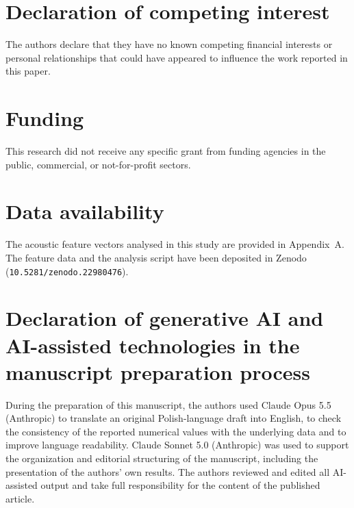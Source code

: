 
\section*{Declaration of competing interest}
The authors declare that they have no known competing financial interests or personal relationships that could have appeared to influence the work reported in this paper.

\section*{Funding}
This research did not receive any specific grant from funding agencies in the public, commercial, or not-for-profit sectors.

\section*{Data availability}
The acoustic feature vectors analysed in this study are provided in Appendix~A. The feature data and the analysis script have been deposited in  Zenodo (\texttt{10.5281/zenodo.22980476}).

\section*{Declaration of generative AI and AI-assisted technologies in the manuscript preparation process}

During the preparation of this manuscript, the authors used Claude Opus 5.5 (Anthropic) to translate an original Polish-language draft into English, to check the consistency of the reported numerical values with the underlying data and to improve language readability. Claude Sonnet 5.0 (Anthropic) was used to support the organization and editorial structuring of the manuscript, including the presentation of the authors' own results. The authors reviewed and edited all AI-assisted output and take full responsibility for the content of the published article.
